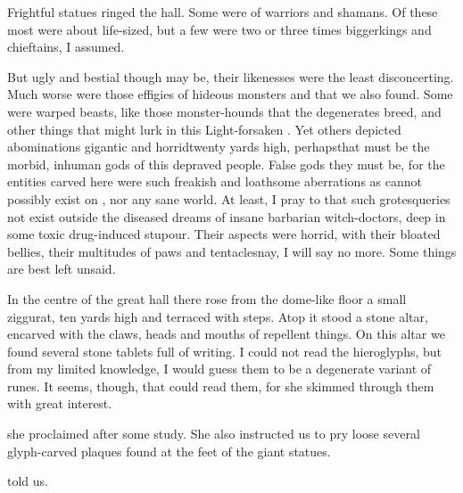\begin{diary}
Frightful statues ringed the hall. 
Some were of \meccaran{} warriors and shamans. 
Of these most were about life-sized, but a few were two or three times bigger\dash kings and chieftains, I assumed. 

But ugly and bestial though \meccara{} may be, their likenesses were the least disconcerting. 
Much worse were those effigies of hideous monsters and \daemons{} that we also found. 
Some were warped beasts, like those monster-hounds that the degenerates breed, and other things that might lurk in this Light-forsaken \Wylde{}. 
Yet others depicted abominations gigantic and horrid\dash twenty yards high, perhaps\dash that must be the morbid, inhuman gods of this depraved people. 
False gods they must be, for the entities carved here were such freakish and loathsome aberrations as 
cannot possibly exist on \Miith{}, nor any sane world.
At least, I pray to \Iquin{} that such grotesqueries not exist outside the diseased dreams of insane barbarian witch-doctors, deep in some toxic drug-induced stupour. 
Their aspects were horrid, with their bloated bellies, their multitudes of paws and tentacles\prikker nay, I will say no more. 
Some things are best left unsaid. 

In the centre of the great hall there rose from the dome-like floor a small ziggurat, ten yards high and terraced with steps. 
Atop it stood a stone altar, encarved with the claws, heads and mouths of repellent things. 
On this altar we found several stone tablets full of writing. 
I could not read the hieroglyphs, but from my limited knowledge, I would guess them to be a degenerate variant of \Draconic{} runes. 
It seems, though, that \Miss{} \Takestsha{} could read them, for she skimmed through them with great interest. 

 she proclaimed after some study. 
She also instructed us to pry loose several glyph-carved plaques found at the feet of the giant statues. 

 \Takestsha{} told us. 


\end{diary}
